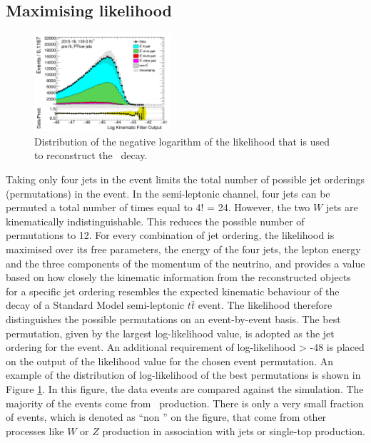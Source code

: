 \documentclass[letterpaper,12pt]{article}
\begin{document}
\subsection{Maximising likelihood}
\label{maximise likelihood}
\begin{figure}[!h]
	\centering
	\includegraphics[width=0.45\textwidth]{FTAG_plots/pretagNoRwwithhighpTPFlowall/DataMC_h_LLR.png}
	\caption{Distribution of  the negative logarithm of the likelihood that
	is used to reconstruct the \ttbar\ decay.}
	\label{fig:llr}
\end{figure}

Taking only four jets in the event limits the total number of possible 
jet orderings (permutations) in the event. In the semi-leptonic channel, 
four jets can be permuted a total number of times equal to 4! = 24. 
However, the two $W$ jets are kinematically indistinguishable. 
This reduces the possible number of permutations to 12. 
For every combination of jet ordering, 
the likelihood is maximised over 
its free parameters, the energy of the four jets, the lepton energy and 
the three components of the momentum of the neutrino, and provides a 
value based on how closely the kinematic information from the reconstructed 
objects for a specific jet ordering resembles the expected kinematic behaviour 
of the decay of a Standard Model semi-leptonic $t\bar{t}$ event. The likelihood 
therefore distinguishes the possible permutations on an event-by-event basis. 
The best permutation, given by the largest log-likelihood value, is adopted 
as the jet ordering for the event. 
An additional requirement of log-likelihood > -48 is 
placed on the output of the likelihood value for the chosen event permutation. 
An example of the distribution of log-likelihood of the best permutations 
is shown in Figure \ref{fig:llr}. 
In this figure, the data events are compared against the simulation.
The majority of the events come from \ttbar\ production. There is only
a very small fraction of events, which is denoted as ``non \ttbar''
on the figure, that come from other processes like $W$ or $Z$ production
in association with jets or single-top production.
\end{document}
